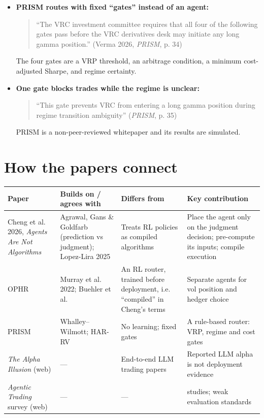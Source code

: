 \documentclass{article}
\begin{document}
\begin{itemize}

\item \textbf{PRISM routes with fixed ``gates'' instead of an agent:}

\begin{quote}``The VRC investment committee requires that all four of the following gates pass before the VRC derivatives desk may initiate any long gamma position.'' (Verma 2026, \emph{PRISM}, p. 34)\end{quote}

The four gates are a VRP threshold, an arbitrage condition, a minimum cost-adjusted Sharpe, and regime certainty.

\item \textbf{One gate blocks trades while the regime is unclear:}

\begin{quote}``This gate prevents VRC from entering a long gamma position during regime transition ambiguity'' (\emph{PRISM}, p. 35)\end{quote}

PRISM is a non-peer-reviewed whitepaper and its results are simulated.

\end{itemize}

\section{How the papers connect}

\begin{center}\small
\begin{tabularx}{\linewidth}{>{\raggedright\arraybackslash}X >{\raggedright\arraybackslash}X >{\raggedright\arraybackslash}X >{\raggedright\arraybackslash}X}
\toprule
\textbf{Paper} & \textbf{Builds on /\allowbreak{} agrees with} & \textbf{Differs from} & \textbf{Key contribution} \\
\midrule
Cheng et al. 2026, \emph{Agents Are Not Algorithms} & Agrawal, Gans \& Goldfarb (prediction vs judgment); Lopez-Lira 2025 & Treats RL policies as compiled algorithms & Place the agent only on the judgment decision; pre-compute its inputs; compile execution \\
OPHR & Murray et al. 2022; Buehler et al. & An RL router, trained before deployment, i.e. ``compiled'' in Cheng's terms & Separate agents for vol position and hedger choice \\
PRISM & Whalley--Wilmott; HAR-RV & No learning; fixed gates & A rule-based router: VRP, regime and cost gates \\
\emph{The Alpha Illusion} (web) & --- & End-to-end LLM trading papers & Reported LLM alpha is not deployment evidence \\
\emph{Agentic Trading} survey (web) & --- & --- & 77 studies; weak evaluation standards \\
\bottomrule
\end{tabularx}
\end{center}
\end{document}
